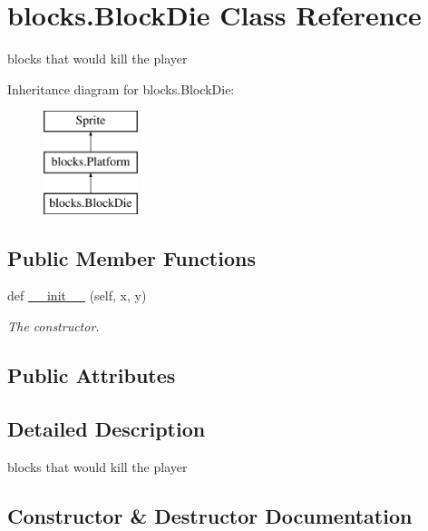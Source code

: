 \hypertarget{classblocks_1_1_block_die}{}\section{blocks.\+Block\+Die Class Reference}
\label{classblocks_1_1_block_die}


blocks that would kill the player  


Inheritance diagram for blocks.\+Block\+Die\+:\begin{figure}[H]
\begin{center}
\leavevmode
\includegraphics[height=3.000000cm]{classblocks_1_1_block_die}
\end{center}
\end{figure}
\subsection*{Public Member Functions}
\begin{DoxyCompactItemize}
\item 
def \hyperlink{classblocks_1_1_block_die_a993ad71b0a3f9ddb84cb092dd4d0b460}{\+\_\+\+\_\+init\+\_\+\+\_\+} (self, x, y)
\begin{DoxyCompactList}\small\item\em The constructor. \end{DoxyCompactList}\end{DoxyCompactItemize}
\subsection*{Public Attributes}
\begin{DoxyCompactItemize}
\end{DoxyCompactItemize}


\subsection{Detailed Description}
blocks that would kill the player 

\subsection{Constructor \& Destructor Documentation}
